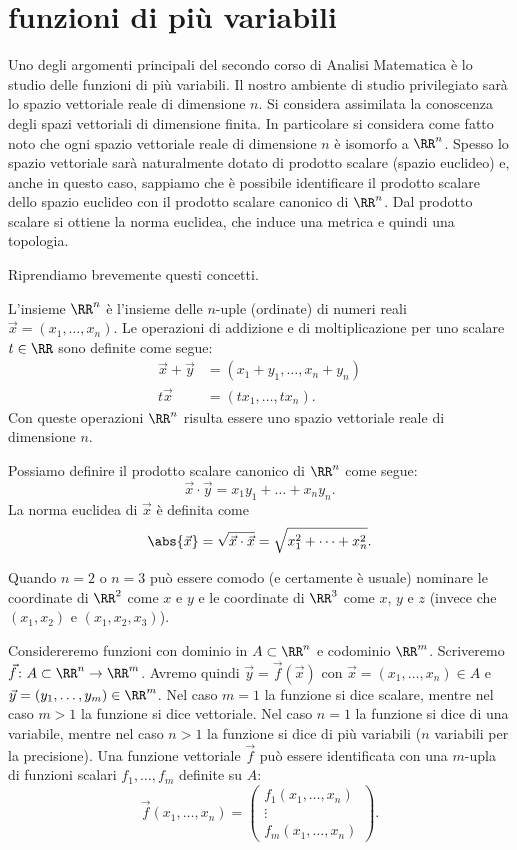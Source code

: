 \section{funzioni di più variabili}

Uno degli argomenti principali del secondo corso di Analisi Matematica è lo studio 
delle funzioni di più variabili. 
Il nostro ambiente di studio privilegiato sarà 
lo spazio vettoriale reale di dimensione $n$. 
Si considera assimilata la conoscenza degli spazi vettoriali di dimensione 
finita. 
In particolare si considera come fatto noto che ogni spazio 
vettoriale reale di dimensione $n$ è isomorfo a $\RR^n$. 
Spesso lo spazio vettoriale sarà naturalmente dotato di prodotto scalare (spazio euclideo) e,
anche in questo caso, sappiamo che è possibile identificare il prodotto scalare 
dello spazio euclideo con il prodotto scalare canonico di $\RR^n$.
Dal prodotto scalare si ottiene la norma euclidea, che induce una metrica e quindi una topologia.

Riprendiamo brevemente questi concetti.
\begin{definition}
L'insieme $\RR^n$ è l'insieme delle $n$-uple (ordinate) di numeri reali 
$\vec x = (x_1,\dots,x_n)$.
Le operazioni di addizione e di moltiplicazione per uno scalare $t\in \RR$
sono definite come segue:
\begin{align*}
\vec x + \vec y &= (x_1+y_1,\dots,x_n+y_n)\\
t \vec x &= (t x_1,\dots,t x_n).
\end{align*}
Con queste operazioni $\RR^n$ risulta essere uno spazio vettoriale reale di dimensione $n$.

Possiamo definire il prodotto scalare canonico di $\RR^n$ come segue:
\[
\vec x \cdot \vec y = x_1 y_1 + \dots + x_n y_n.
\]
La norma euclidea di $\vec x$ è definita come
\[
\abs{\vec x} = \sqrt{\vec x\cdot \vec x} = \sqrt{x_1^2 + \dots + x_n^2}.
\]
\end{definition}

Quando $n=2$ o $n=3$ può essere comodo (e certamente è usuale) nominare 
le coordinate di $\RR^2$ come $x$ e $y$ e le coordinate di $\RR^3$ come $x$, $y$ e $z$
(invece che $(x_1,x_2)$ e $(x_1,x_2,x_3)$).

Considereremo funzioni con dominio in $A\subset \RR^n$ e codominio $\RR^m$. 
Scriveremo $\vec f\colon A \subset \RR^n \to \RR^m$.
Avremo quindi $\vec y = \vec f(\vec x)$ con $\vec x =(x_1,\dots,x_n)\in A$ e $\vec y = (y_1,\dots,y_m)\in \RR^m$.
Nel caso $m=1$ la funzione si dice scalare, 
mentre nel caso $m>1$ la funzione si dice vettoriale.
Nel caso $n=1$ la funzione si dice di una variabile, 
mentre nel caso $n>1$ la funzione si dice di 
più variabili ($n$ variabili per la precisione).
Una funzione vettoriale $\vec f$ può essere identificata con una 
$m$-upla di funzioni scalari $f_1,\dots,f_m$ definite su $A$:
\[
  \vec f(x_1, \dots, x_n) = \begin{pmatrix}
    f_1(x_1,\dots, x_n) \\
    \vdots \\
    f_m(x_1,\dots, x_n)
  \end{pmatrix}.
\]

